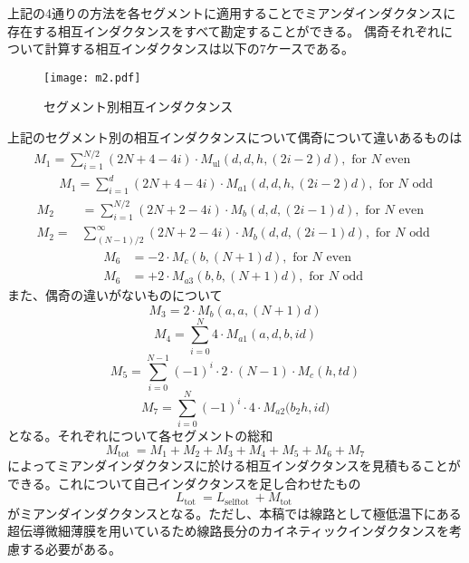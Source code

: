 上記の4通りの方法を各セグメントに適用することでミアンダインダクタンスに存在する相互インダクタンスをすべて勘定することができる。
偶奇それぞれについて計算する相互インダクタンスは以下の7ケースである。
\begin{figure}[H]
    \centering
    \texttt{[image: m2.pdf]}
    \caption{セグメント別相互インダクタンス}
\end{figure}
上記のセグメント別の相互インダクタンスについて偶奇について違いあるものは
\begin{equation}
    \begin{array}{l}
    M_{1}=\sum_{i=1}^{N / 2}(2 N+4-4 i) \cdot M_{\mathrm{ul}}(d, d, h,(2 i-2) d), \text { for } N \text { even } \\
    \qquad M_{1}=\sum_{i=1}^{d}(2 N+4-4 i) \cdot M_{a 1}(d, d, h,(2 i-2) d), \text { for } N \text { odd }
    \end{array}
\end{equation}
\begin{equation}
    \begin{aligned}
    M_{2} &=\sum_{i=1}^{N / 2}(2 N+2-4 i) \cdot M_{b}(d, d,(2 i-1) d), \text { for } N \text { even } \\
    M_{2}=&\sum_{(N-1) / 2}^{\infty}(2 N+2-4 i) \cdot M_{b}(d, d,(2 i-1) d), \text { for } N \text { odd }
    \end{aligned}
\end{equation}
\begin{equation}
    \begin{aligned}
    M_{6}&=-2 \cdot M_{c}(b,(N+1) d), \text { for } N \text { even }\\
    M_{6}&=+2 \cdot M_{a 3}(b, b,(N+1) d), \text { for } N \text { odd }
    \end{aligned}
\end{equation}
また、偶奇の違いがないものについて
\begin{equation}
    M_{3}=2 \cdot M_{b}(a, a,(N+1) d)
\end{equation}
\begin{equation}
    M_{4}=\sum_{i=0}^{N} 4 \cdot M_{a 1}(a, d, b, i d)
\end{equation}
\begin{equation}
    M_{5}=\sum_{i=0}^{N-1}(-1)^{i} \cdot 2 \cdot(N-1) \cdot M_{c}(h, t d)
\end{equation}
\begin{equation}
    M_{7}=\sum_{i=0}^{N}(-1)^{i} \cdot 4 \cdot M_{a 2}\biggl(b_{2} h, i d\biggr)
\end{equation}
となる。それぞれについて各セグメントの総和
\begin{equation}
    M_{\text {tot }}=M_{1}+M_{2}+M_{3}+M_{4}+M_{5}+M_{6}+M_{7}
\end{equation}
によってミアンダインダクタンスに於ける相互インダクタンスを見積もることができる。これについて自己インダクタンスを足し合わせたもの
\begin{equation}
    L_{\text {tot }}=L_{\text {selftot }}+M_{\text {tot }}
\end{equation}
がミアンダインダクタンスとなる。ただし、本稿では線路として極低温下にある超伝導微細薄膜を用いているため線路長分のカイネティックインダクタンスを考慮する必要がある。


